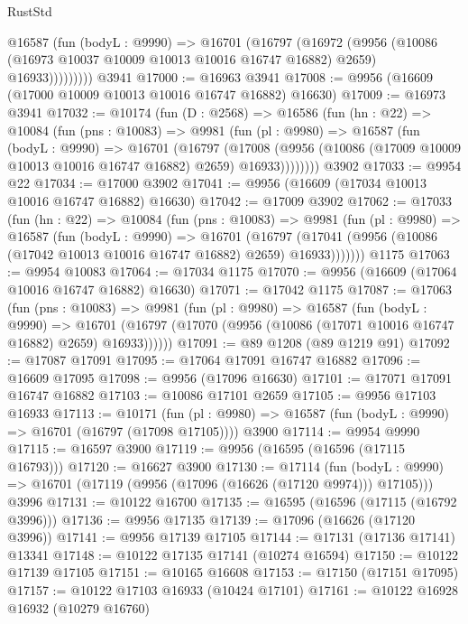 \begin{lexlean}{RustStd}
\begin{coremodule}
            @16587
              (fun (bodyL : @9990) =>
              @16701
                (@16797
                  (@16972
                    (@9956
                      (@10086 (@16973 @10037 @10009 @10013 @10016 @16747 @16882) @2659)
                      @16933)))))))))
    @3941
@17000 := @16963 @3941
@17008 := @9956 (@16609 (@17000 @10009 @10013 @10016 @16747 @16882) @16630)
@17009 := @16973 @3941
@17032 := @10174
    (fun (D : @2568) =>
    @16586
      (fun (hn : @22) =>
      @10084
        (fun (pns : @10083) =>
        @9981
          (fun (pl : @9980) =>
          @16587
            (fun (bodyL : @9990) =>
            @16701
              (@16797
                (@17008
                  (@9956 (@10086 (@17009 @10009 @10013 @10016 @16747 @16882) @2659) @16933))))))))
    @3902
@17033 := @9954 @22
@17034 := @17000 @3902
@17041 := @9956 (@16609 (@17034 @10013 @10016 @16747 @16882) @16630)
@17042 := @17009 @3902
@17062 := @17033
    (fun (hn : @22) =>
    @10084
      (fun (pns : @10083) =>
      @9981
        (fun (pl : @9980) =>
        @16587
          (fun (bodyL : @9990) =>
          @16701
            (@16797 (@17041 (@9956 (@10086 (@17042 @10013 @10016 @16747 @16882) @2659) @16933)))))))
    @1175
@17063 := @9954 @10083
@17064 := @17034 @1175
@17070 := @9956 (@16609 (@17064 @10016 @16747 @16882) @16630)
@17071 := @17042 @1175
@17087 := @17063
    (fun (pns : @10083) =>
    @9981
      (fun (pl : @9980) =>
      @16587
        (fun (bodyL : @9990) =>
        @16701 (@16797 (@17070 (@9956 (@10086 (@17071 @10016 @16747 @16882) @2659) @16933))))))
@17091 := @89 @1208 (@89 @1219 @91)
@17092 := @17087 @17091
@17095 := @17064 @17091 @16747 @16882
@17096 := @16609 @17095
@17098 := @9956 (@17096 @16630)
@17101 := @17071 @17091 @16747 @16882
@17103 := @10086 @17101 @2659
@17105 := @9956 @17103 @16933
@17113 := @10171
    (fun (pl : @9980) => @16587 (fun (bodyL : @9990) => @16701 (@16797 (@17098 @17105))))
    @3900
@17114 := @9954 @9990
@17115 := @16597 @3900
@17119 := @9956 (@16595 (@16596 (@17115 @16793)))
@17120 := @16627 @3900
@17130 := @17114
    (fun (bodyL : @9990) => @16701 (@17119 (@9956 (@17096 (@16626 (@17120 @9974))) @17105)))
    @3996
@17131 := @10122 @16700
@17135 := @16595 (@16596 (@17115 (@16792 @3996)))
@17136 := @9956 @17135
@17139 := @17096 (@16626 (@17120 @3996))
@17141 := @9956 @17139 @17105
@17144 := @17131 (@17136 @17141) @13341
@17148 := @10122 @17135 @17141 (@10274 @16594)
@17150 := @10122 @17139 @17105
@17151 := @10165 @16608
@17153 := @17150 (@17151 @17095)
@17157 := @10122 @17103 @16933 (@10424 @17101)
@17161 := @10122 @16928 @16932 (@10279 @16760)

\end{coremodule}
\end{lexlean}
